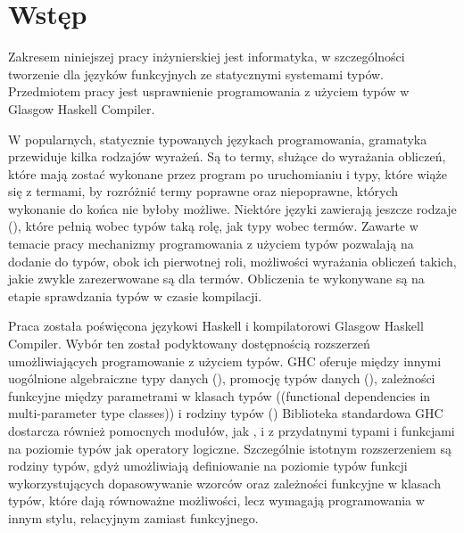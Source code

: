 \chapter{Wstęp}\label{chap:wstep}

Zakresem niniejszej pracy inżynierskiej jest informatyka, w szczególności
tworzenie dla języków funkcyjnych ze statycznymi systemami typów.
Przedmiotem pracy jest usprawnienie
programowania z użyciem typów w Glasgow Haskell Compiler.

W popularnych, statycznie typowanych językach programowania, gramatyka przewiduje
kilka rodzajów wyrażeń. Są to termy, służące do wyrażania obliczeń, które mają zostać
wykonane przez program po uruchomianiu i typy, które wiąże się z termami, by
rozróżnić termy poprawne oraz niepoprawne, których wykonanie do końca nie byłoby możliwe.
Niektóre języki zawierają jeszcze rodzaje (), które pełnią wobec
typów taką rolę, jak typy wobec termów. Zawarte w temacie pracy mechanizmy programowania
z użyciem typów pozwalają na dodanie do typów, obok ich pierwotnej roli, możliwości
wyrażania obliczeń takich, jakie zwykle zarezerwowane są dla termów.
Obliczenia te wykonywane są na etapie sprawdzania typów w czasie kompilacji.


Praca została poświęcona językowi Haskell i kompilatorowi Glasgow Haskell
Compiler. Wybór ten został podyktowany dostępnością rozszerzeń umożliwiających
programowanie z użyciem typów. GHC oferuje między innymi uogólnione algebraiczne
typy danych (\cite{ExtPhantomTypes}\cite{ExtGADTs}),
promocję typów danych (\cite{ExtPromotion}),
zależności funkcyjne między parametrami w klasach typów
(\foreign(functional dependencies in multi-parameter type classes)\cite{ExtFunDeps})
i rodziny typów (\cite{ExtAssocTyFams}\cite{ExtAssocTypesWithClass}\cite{ExtClosedTyFams})
Biblioteka standardowa GHC dostarcza również pomocnych modułów, jak ,
 i  z przydatnymi typami i funkcjami na poziomie
typów jak operatory logiczne.
Szczególnie istotnym rozszerzeniem są rodziny typów, gdyż umożliwiają
definiowanie na poziomie typów funkcji wykorzystujących
dopasowywanie wzorców oraz zależności funkcyjne w klasach typów,
które dają równoważne możliwości, lecz wymagają programowania w innym stylu,
relacyjnym zamiast funkcyjnego.

